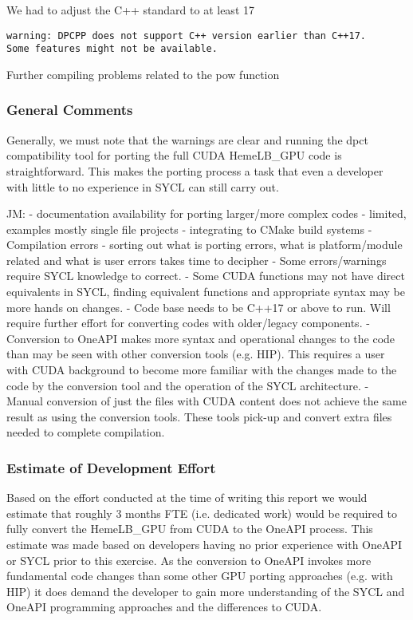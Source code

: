 \documentclass[../main]{subfiles}
\begin{document}
We had to adjust the C++ standard to at least 17
\begin{verbatim}
warning: DPCPP does not support C++ version earlier than C++17. 
Some features might not be available.
\end{verbatim}

Further compiling problems related to the pow function


\subsubsection{General Comments}


Generally, we must note that the warnings are clear and running the dpct compatibility tool for porting the full CUDA HemeLB\_GPU code is straightforward. This makes the porting process a task that even a developer with little to no experience in SYCL can still carry out.  

JM:
- documentation availability for porting larger/more complex codes - limited, examples mostly single file projects
- integrating to CMake build systems
- Compilation errors - sorting out what is porting errors, what is platform/module related and what is user errors takes time to decipher
- Some errors/warnings require SYCL knowledge to correct. 
- Some CUDA functions may not have direct equivalents in SYCL, finding equivalent functions and appropriate syntax may be more hands on changes.
- Code base needs to be C++17 or above to run. Will require further effort for converting codes with older/legacy components.
- Conversion to OneAPI makes more syntax and operational changes to the code than may be seen with other conversion tools (e.g. HIP). This requires a user with CUDA background to become more familiar with the changes made to the code by the conversion tool and the operation of the SYCL architecture.
- Manual conversion of just the files with CUDA content does not achieve the same result as using the conversion tools. These tools pick-up and convert extra files needed to complete compilation. 



\subsubsection{Estimate of Development Effort}
Based on the effort conducted at the time of writing this report we would estimate that roughly 3 months FTE (i.e. dedicated work) would be required to fully convert the HemeLB\_GPU from CUDA to the OneAPI process. This estimate was made based on developers having no prior experience with OneAPI or SYCL prior to this exercise. As the conversion to OneAPI invokes more fundamental code changes than some other GPU porting approaches (e.g. with HIP) it does demand the developer to gain more understanding of the SYCL and OneAPI programming approaches and the differences to CUDA.
\end{document}

